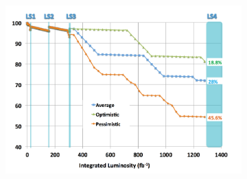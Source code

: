 	\begin{figure}[H]
		\begin{subfigure}{\linewidth}
			\centering
			\includegraphics[width=0.8\plotwidth]{fig/chapt3/DT-channel-failure.png}\\
			\caption{\label{fig:DT-upgrade:A}}
			

\end{subfigure}
\end{figure}
